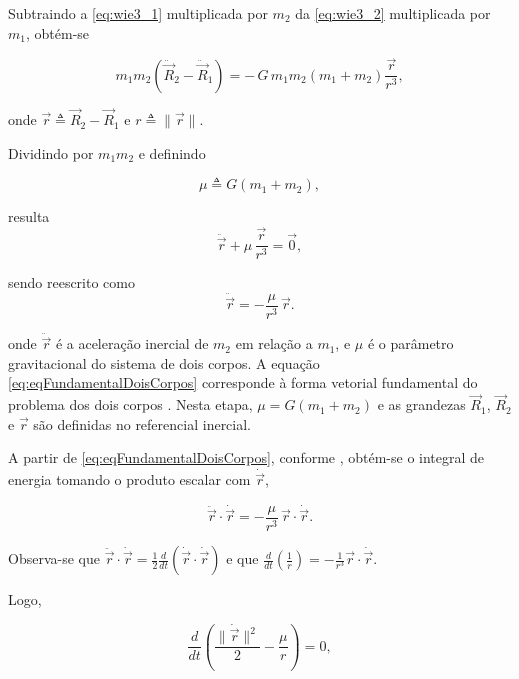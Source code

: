 Subtraindo a \eqref{eq:wie3_1} multiplicada por $m_2$ da \eqref{eq:wie3_2} multiplicada por $m_1$, obtém-se

\begin{equation}
m_1 m_2\left(\ddot{\vec R}_2-\ddot{\vec R}_1\right)
=
-\,G\,m_1 m_2\left(m_1+m_2\right)\frac{\vec r}{r^3},
\end{equation}

onde $\vec r\triangleq \vec R_2-\vec R_1$ e $r\triangleq\|\vec r\|$.

Dividindo por $m_1 m_2$ e definindo

\begin{equation}
\mu \triangleq G(m_1+m_2),
\end{equation}

resulta
\begin{equation}
\label{eq:eqFundamentalDoisCorpos1}
\ddot{\vec{r}} + \mu\,\frac{\vec{r}}{r^3} = \vec 0,
\end{equation}

sendo reescrito como
\begin{equation}
\label{eq:eqFundamentalDoisCorpos}
\ddot{\vec r} = -\frac{\mu}{r^3}\,\vec r.
\end{equation}

onde $\ddot{\vec r}$ é a aceleração inercial de $m_2$ em relação a $m_1$, e $\mu$ é o parâmetro gravitacional do sistema de dois corpos.
A equação \eqref{eq:eqFundamentalDoisCorpos} corresponde à forma vetorial fundamental do problema dos dois corpos \cite{wie2008space}.
Nesta etapa, $\mu=G(m_1+m_2)$ e as grandezas $\vec R_1$, $\vec R_2$ e $\vec r$ são definidas no referencial inercial.

A partir de \eqref{eq:eqFundamentalDoisCorpos}, conforme \cite{wie2008space}, obtém-se o integral de energia tomando o produto escalar com $\dot{\vec r}$,

\begin{equation}
\ddot{\vec r}\cdot \dot{\vec r}
=
-\frac{\mu}{r^3}\,\vec r\cdot \dot{\vec r}.
\label{eq:energia_dot_1}
\end{equation}

Observa-se que $\ddot{\vec r}\cdot \dot{\vec r}=\frac{1}{2}\frac{d}{dt}\!\left(\dot{\vec r}\cdot \dot{\vec r}\right)$ e que $\frac{d}{dt}\!\left(\frac{1}{r}\right)=-\frac{1}{r^3}\vec r\cdot \dot{\vec r}$.

Logo,

\begin{equation}
\frac{d}{dt}\left(\frac{\|\dot{\vec r}\|^2}{2}-\frac{\mu}{r}\right)=0,
\label{eq:energia_constante}
\end{equation}

